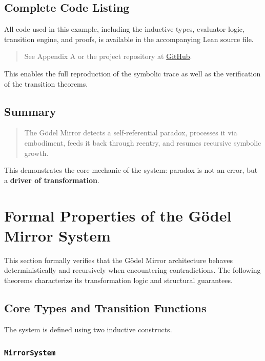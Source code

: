\documentclass[manuscript,nonacm]{acmart}
\begin{document}
\subsection{Complete Code Listing}

All code used in this example, including the inductive types, evaluator logic, transition engine, and proofs, is available in the accompanying Lean source file.

\begin{quote}
See Appendix A or the project repository at \href{https://github.com/jhetchan/godel-mirror}{GitHub}.
\end{quote}

This enables the full reproduction of the symbolic trace as well as the verification of the transition theorems.

\subsection{Summary}

\begin{quote}
The Gödel Mirror detects a self-referential paradox, processes it via embodiment, feeds it back through reentry, and resumes recursive symbolic growth.
\end{quote}

This demonstrates the core mechanic of the system: paradox is not an error, but a \textbf{driver of transformation}.

\section{Formal Properties of the Gödel Mirror System}

This section formally verifies that the Gödel Mirror architecture behaves deterministically and recursively when encountering contradictions. The following theorems characterize its transformation logic and structural guarantees.

\subsection{Core Types and Transition Functions}

The system is defined using two inductive constructs.

\subsubsection{\texttt{MirrorSystem}}
\end{document}
